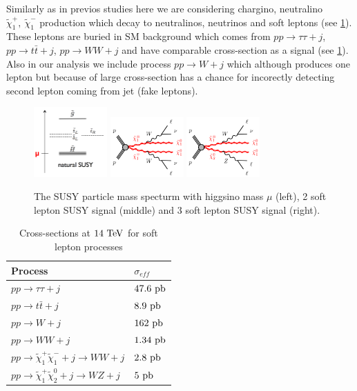 \documentclass[tightenline,notitlepage,nofootinbib]{revtex4-1}
\begin{document}
Similarly as in previos studies \cite{PhysRevD.89.075007,ATL-PHYS-PUB-2015,PhysRevD.93.052002} here we are considering chargino, neutralino $\tilde \chi_1^{+},~\tilde \chi_1^{-}$ production which decay to neutralinos, neutrinos and soft leptons (see \cref{fig:basic}). These leptons are buried in SM background which comes from $pp\to \tau \tau + j$, $pp\to t \bar t + j$, $pp \to WW + j$ and have comparable cross-section as a signal (see \cref{tab:cross}). Also in our analysis we include process $pp \to W +j$ which although produces one lepton but because of large cross-section has a chance for incorectly detecting second lepton coming from jet (fake leptons). 
\begin{figure}[!ht]
    \centering
    \includegraphics[width=0.25\textwidth]{splittings.png}
    \includegraphics[width=0.25\textwidth]{C1C1.png}
    \includegraphics[width=0.25\textwidth]{C1N2.png}
    \caption{The SUSY particle mass specturm with higgsino mass $\mu$ (left), 2 soft lepton SUSY signal (middle) and 3 soft lepton SUSY signal (right).}
    \label{fig:basic}
  \end{figure}

\begin{table}[!ht]
  \centering
  \begin{tabular}{ll}
    Process & $\sigma_{eff}$ \\
    \hline
    $pp\rightarrow \tau \tau + j$ & $47.6~\rm{pb}$\\
    $pp\rightarrow t \bar t + j$ & $ 8.9~\rm{pb}$\\
    $pp \rightarrow W + j$ &  $162~\rm{pb}$ \\
    $pp \rightarrow WW +j$ & $1.34~\rm{pb}$\\
    $pp \rightarrow \tilde \chi_1^{+}\tilde \chi_1^{-} + j \rightarrow WW + j$ & $2.8~\rm{pb}$\\
    $pp \rightarrow \tilde \chi_1^{+}\tilde \chi_2^{0} + j \rightarrow WZ + j$ & $5~\rm{pb}$\\
  \end{tabular}
  \caption{Cross-sections at $14~\rm{TeV}$ for soft lepton processes}
  \label{tab:cross}
\end{table}
\end{document}
